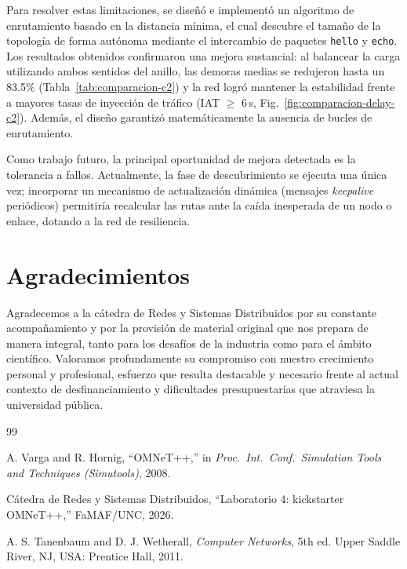 \documentclass[10pt,letterpaper,twocolumn]{article}
\begin{document}
Para resolver estas limitaciones, se diseñó e implementó un algoritmo de enrutamiento basado en la distancia mínima, el cual descubre el tamaño de la topología de forma autónoma mediante el intercambio de paquetes \texttt{hello} y \texttt{echo}. Los resultados obtenidos confirmaron una mejora sustancial: al balancear la carga utilizando ambos sentidos del anillo, las demoras medias se redujeron hasta un 83.5\% (Tabla~\ref{tab:comparacion-c2}) y la red logró mantener la estabilidad frente a mayores tasas de inyección de tráfico (IAT $\geq$ 6\,s, Fig.~\ref{fig:comparacion-delay-c2}). Además, el diseño garantizó matemáticamente la ausencia de bucles de enrutamiento.

Como trabajo futuro, la principal oportunidad de mejora detectada es la tolerancia a fallos. Actualmente, la fase de descubrimiento se ejecuta una única vez; incorporar un mecanismo de actualización dinámica (mensajes \emph{keepalive} periódicos) permitiría recalcular las rutas ante la caída inesperada de un nodo o enlace, dotando a la red de resiliencia.

\section*{Agradecimientos}

Agradecemos a la cátedra de Redes y Sistemas Distribuidos por su constante acompañamiento y por la provisión de material original que nos prepara de manera integral, tanto para los desafíos de la industria como para el ámbito científico. Valoramos profundamente su compromiso con nuestro crecimiento personal y profesional, esfuerzo que resulta destacable y necesario frente al actual contexto de desfinanciamiento y dificultades presupuestarias que atraviesa la universidad pública.

\begin{thebibliography}{99}

A. Varga and R. Hornig,
``OMNeT++,''
in \emph{Proc.\ Int.\ Conf.\ Simulation Tools and Techniques (Simutools)}, 2008.

Cátedra de Redes y Sistemas Distribuidos,
``Laboratorio 4: kickstarter OMNeT++,''
FaMAF/UNC, 2026.

A. S. Tanenbaum and D. J. Wetherall,
\emph{Computer Networks}, 5th ed.
Upper Saddle River, NJ, USA: Prentice Hall, 2011.

\end{thebibliography}
\end{document}
